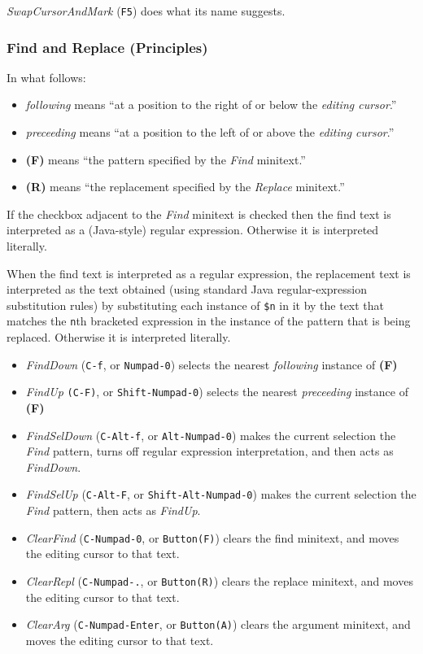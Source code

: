 \documentclass[11pt,a4paper]{article}
\begin{document}
\emph{SwapCursorAndMark} (\texttt{F5}) does what its name suggests.

\hypertarget{find-and-replace-principles}{%
\subsubsection{Find and Replace
(Principles)}\label{find-and-replace-principles}}

In what follows:

\begin{itemize}
\item
  \emph{following} means ``at a position to the right of or below the
  \emph{editing cursor}.''
\item
  \emph{preceeding} means ``at a position to the left of or above the
  \emph{editing cursor}.''
\item
  \textbf{(F)} means ``the pattern specified by the \emph{Find}
  minitext.''
\item
  \textbf{(R)} means ``the replacement specified by the \emph{Replace}
  minitext.''
\end{itemize}

If the checkbox adjacent to the \emph{Find} minitext is checked then the
find text is interpreted as a (Java-style) regular expression. Otherwise
it is interpreted literally.

When the find text is interpreted as a regular expression, the
replacement text is interpreted as the text obtained (using standard
Java regular-expression substitution rules) by substituting each
instance of \texttt{\$n} in it by the text that matches the \texttt{n}th
bracketed expression in the instance of the pattern that is being
replaced. Otherwise it is interpreted literally.


\begin{itemize}
\item
  \emph{FindDown} (\texttt{C-f}, or \texttt{Numpad-0}) selects the
  nearest \emph{following} instance of \textbf{(F)}
\item
  \emph{FindUp} \texttt{(C-F)}, or \texttt{Shift-Numpad-0}) selects the
  nearest \emph{preceeding} instance of \textbf{(F)}
\item
  \emph{FindSelDown} (\texttt{C-Alt-f}, or \texttt{Alt-Numpad-0}) makes
  the current selection the \emph{Find} pattern, turns off regular
  expression interpretation, and then acts as \emph{FindDown}.
\item
  \emph{FindSelUp} (\texttt{C-Alt-F}, or \texttt{Shift-Alt-Numpad-0})
  makes the current selection the \emph{Find} pattern, then acts as
  \emph{FindUp}.
\item
  \emph{ClearFind} (\texttt{C-Numpad-0}, or \texttt{Button(F)}) clears
  the find minitext, and moves the editing cursor to that text.
\item
  \emph{ClearRepl} (\texttt{C-Numpad-.}, or \texttt{Button(R)}) clears
  the replace minitext, and moves the editing cursor to that text.
\item
  \emph{ClearArg} (\texttt{C-Numpad-Enter}, or \texttt{Button(A)})
  clears the argument minitext, and moves the editing cursor to that
  text.
\end{itemize}
\end{document}
